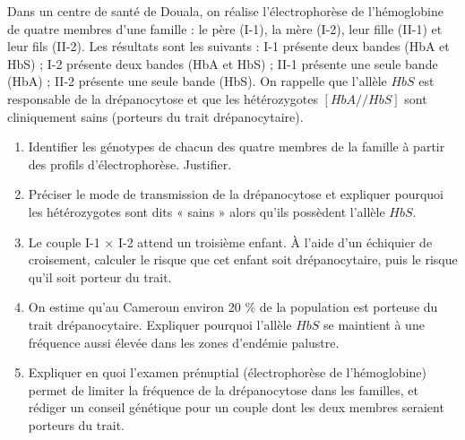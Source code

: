 \documentclass[11pt]{article}
\begin{document}
\begin{exercice}
Dans un centre de santé de Douala, on réalise l'électrophorèse de l'hémoglobine de quatre membres d'une famille : le père (I-1), la mère (I-2), leur fille (II-1) et leur fils (II-2). Les résultats sont les suivants : I-1 présente deux bandes (HbA et HbS) ; I-2 présente deux bandes (HbA et HbS) ; II-1 présente une seule bande (HbA) ; II-2 présente une seule bande (HbS). On rappelle que l'allèle $HbS$ est responsable de la drépanocytose et que les hétérozygotes $[HbA//HbS]$ sont cliniquement sains (porteurs du trait drépanocytaire).
\begin{enumerate}
\item Identifier les génotypes de chacun des quatre membres de la famille à partir des profils d'électrophorèse. Justifier.
\item Préciser le mode de transmission de la drépanocytose et expliquer pourquoi les hétérozygotes sont dits « sains » alors qu'ils possèdent l'allèle $HbS$.
\item Le couple I-1 $\times$ I-2 attend un troisième enfant. À l'aide d'un échiquier de croisement, calculer le risque que cet enfant soit drépanocytaire, puis le risque qu'il soit porteur du trait.
\item On estime qu'au Cameroun environ 20 \% de la population est porteuse du trait drépanocytaire. Expliquer pourquoi l'allèle $HbS$ se maintient à une fréquence aussi élevée dans les zones d'endémie palustre.
\item Expliquer en quoi l'examen prénuptial (électrophorèse de l'hémoglobine) permet de limiter la fréquence de la drépanocytose dans les familles, et rédiger un conseil génétique pour un couple dont les deux membres seraient porteurs du trait.
\end{enumerate}
\end{exercice}
\end{document}
